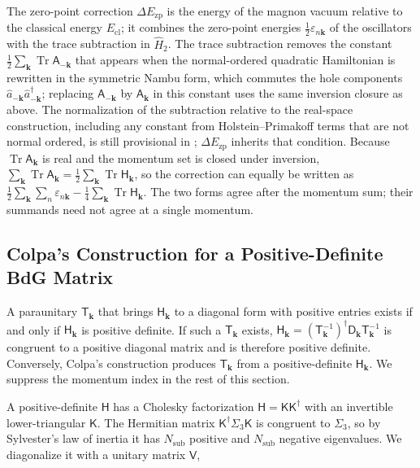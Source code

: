 The zero-point correction \(\Delta E_{\mathrm{zp}}\) is the energy of the magnon vacuum relative to the classical energy \(E_{\mathrm{cl}}\); it combines the zero-point energies \(\frac12\varepsilon_{n\mathbf k}\) of the oscillators with the trace subtraction in \(\hat H_2\). The trace subtraction removes the constant \(\frac12\sum_{\mathbf k}\operatorname{Tr}\mathsf A_{-\mathbf k}\) that appears when the normal-ordered quadratic Hamiltonian is rewritten in the symmetric Nambu form, which commutes the hole components \(\hat a_{-\mathbf k}\hat a_{-\mathbf k}^\dagger\); replacing \(\mathsf A_{-\mathbf k}\) by \(\mathsf A_{\mathbf k}\) in this constant uses the same inversion closure as above. The normalization of the subtraction relative to the real-space construction, including any constant from Holstein--Primakoff terms that are not normal ordered, is still provisional in ; \(\Delta E_{\mathrm{zp}}\) inherits that condition. Because \(\operatorname{Tr}\mathsf A_{\mathbf k}\) is real and the momentum set is closed under inversion, \(\sum_{\mathbf k}\operatorname{Tr}\mathsf A_{\mathbf k}=\frac12\sum_{\mathbf k}\operatorname{Tr}\mathsf H_{\mathbf k}\), so the correction can equally be written as \(\frac12\sum_{\mathbf k}\sum_n\varepsilon_{n\mathbf k}-\frac14\sum_{\mathbf k}\operatorname{Tr}\mathsf H_{\mathbf k}\). The two forms agree after the momentum sum; their summands need not agree at a single momentum.

\subsection{Colpa's Construction for a Positive-Definite BdG Matrix}

A paraunitary \(\mathsf T_{\mathbf k}\) that brings \(\mathsf H_{\mathbf k}\) to a diagonal form with positive entries exists if and only if \(\mathsf H_{\mathbf k}\) is positive definite. If such a \(\mathsf T_{\mathbf k}\) exists, \(\mathsf H_{\mathbf k}=(\mathsf T_{\mathbf k}^{-1})^\dagger\mathsf D_{\mathbf k}\mathsf T_{\mathbf k}^{-1}\) is congruent to a positive diagonal matrix and is therefore positive definite. Conversely, Colpa's construction produces \(\mathsf T_{\mathbf k}\) from a positive-definite \(\mathsf H_{\mathbf k}\). We suppress the momentum index in the rest of this section.

A positive-definite \(\mathsf H\) has a Cholesky factorization \(\mathsf H=\mathsf K\mathsf K^\dagger\) with an invertible lower-triangular \(\mathsf K\). The Hermitian matrix \(\mathsf K^\dagger\Sigma_3\mathsf K\) is congruent to \(\Sigma_3\), so by Sylvester's law of inertia it has \(N_{\mathrm{sub}}\) positive and \(N_{\mathrm{sub}}\) negative eigenvalues. We diagonalize it with a unitary matrix \(\mathsf V\),

